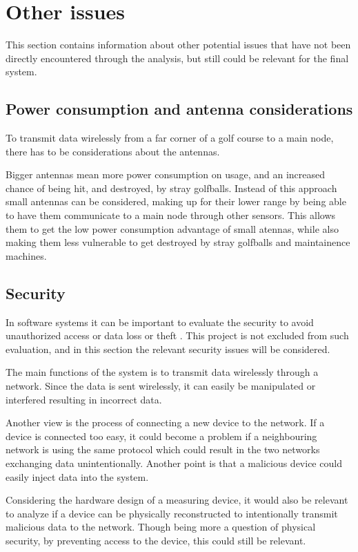 \section{Other issues}
This section contains information about other potential issues that have not been directly encountered through the analysis, but still could be relevant for the final system.

\subsection{Power consumption and antenna considerations} 
To transmit data wirelessly from a far corner of a golf course to a main node, there has to be considerations about the antennas. 

Bigger antennas mean more power consumption on usage, and an increased chance of being hit, and destroyed, by stray golfballs. Instead of this approach small antennas can be considered, making up for their lower range by being able to have them communicate to a main node through other sensors. This allows them to get the low power consumption advantage of small atennas, while also making them less vulnerable to get destroyed by stray golfballs and maintainence machines.

\subsection{Security}
In software systems it can be important to evaluate the security to avoid unauthorized access or data loss or theft . This project is not excluded from such evaluation, and in this section the relevant security issues will be considered.

The main functions of the system is to transmit data wirelessly through a network. Since the data is sent wirelessly, it can easily be manipulated or interfered resulting in incorrect data.

Another view is the process of connecting a new device to the network. If a device is connected too easy, it could become a problem if a neighbouring network is using the same protocol which could result in the two networks exchanging data unintentionally. Another point is that a malicious device could easily inject data into the system.

Considering the hardware design of a measuring device, it would also be relevant to analyze if a device can be physically reconstructed to intentionally transmit malicious data to the network. Though being more a question of physical security, by preventing access to the device, this could still be relevant.

